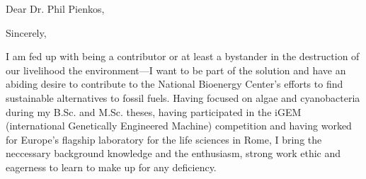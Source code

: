 \documentclass[11pt,a4paper,sans]{moderncv}
\begin{document}






\thispagestyle{titlepage}

\date{\today}
\opening{Dear Dr. Phil Pienkos,}
\closing{Sincerely,}
\makelettertitle
\begin{spacing}{1.15}

I am fed up with being a contributor or at least a bystander in the destruction of our livelihood the environment---I want to be part of the solution and have an abiding desire to contribute to the National Bioenergy Center's efforts to find sustainable alternatives to fossil fuels. 
Having focused on algae and cyanobacteria during my B.Sc. and M.Sc. theses, having participated in the iGEM (international Genetically Engineered Machine) competition and having worked for Europe's flagship laboratory for the life sciences in Rome, I bring the neccessary background knowledge and the enthusiasm, strong work ethic and eagerness to learn to make up for any deficiency.\par\vspace*{1mm}


\end{spacing}
\end{document}
